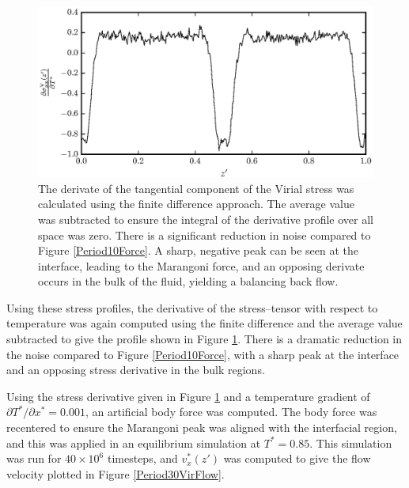 \begin{figure}[h!]
\centering
\includegraphics[scale=1.0]{Period30VirForce}
\caption{The derivate of the tangential component of the Virial stress was calculated using the finite difference approach.
The average value was subtracted to ensure the integral of the derivative profile over all space was zero.
There is a significant reduction in noise compared to Figure \ref{Period10Force}.
A sharp, negative peak can be seen at the interface, leading to the Marangoni force, and an opposing derivate occurs in the bulk of the fluid, yielding a balancing back flow.
}
\label{Period30VirForce}
\end{figure}

Using these stress profiles, the derivative of the stress--tensor with respect to temperature was again computed using the finite difference and the average value subtracted to give the profile shown in Figure \ref{Period30VirForce}.
There is a dramatic reduction in the noise compared to Figure \ref{Period10Force}, with a sharp peak at the interface and an opposing stress derivative in the bulk regions.
\FloatBarrier

Using the stress derivative given in Figure \ref{Period30VirForce} and a temperature gradient of $\partial T^{*} / \partial x^{*} = 0.001$, an artificial body force was computed.
The body force was recentered to ensure the Marangoni peak was aligned with the interfacial region, and this was applied in an equilibrium simulation at $T^{*} = 0.85$.
This simulation was run for $40 \times 10^{6}$ timesteps, and $v^{*}_x(z')$ was computed to give the flow velocity plotted in Figure \ref{Period30VirFlow}.

